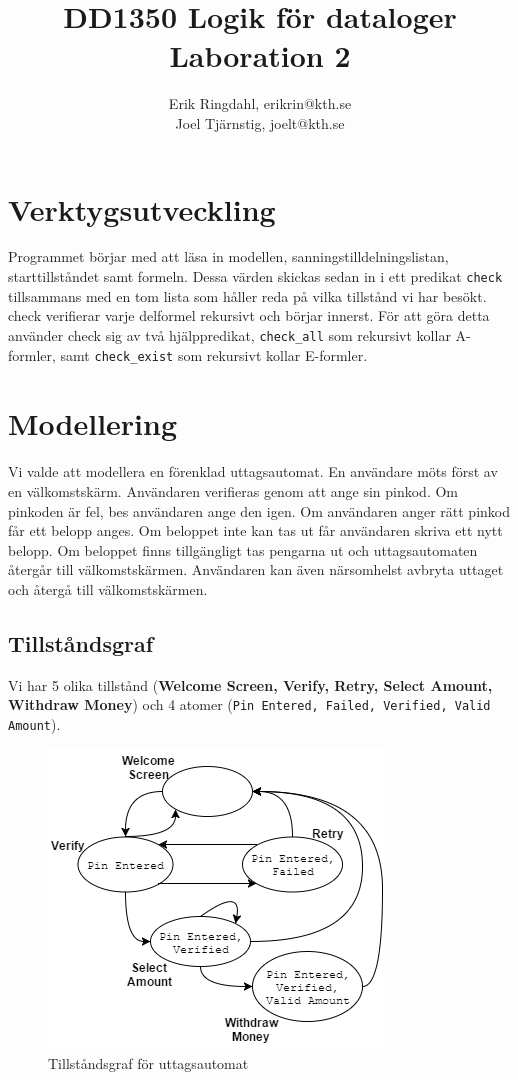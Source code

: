 \documentclass[]{article}
\title{DD1350 Logik för dataloger \\ Laboration 2}
\author{Erik Ringdahl, erikrin@kth.se \\ Joel Tjärnstig, joelt@kth.se}
\begin{document}
\setlength\parindent{0pt}
\maketitle

\section{Verktygsutveckling}
Programmet börjar med att läsa in modellen, sanningstilldelningslistan, starttillståndet samt formeln. Dessa värden skickas sedan in i ett predikat \texttt{check} tillsammans med en tom lista som håller reda på vilka tillstånd vi har besökt. check verifierar varje delformel rekursivt och börjar innerst. För att göra detta använder check sig av två hjälppredikat, \texttt{check\_all} som rekursivt kollar A-formler, samt \texttt{check\_exist} som rekursivt kollar E-formler.

\clearpage
\section{Modellering}
Vi valde att modellera en förenklad uttagsautomat. En användare möts först av en välkomstskärm. Användaren verifieras genom att ange sin pinkod. Om pinkoden är fel, bes användaren ange den igen. Om användaren anger rätt pinkod får ett belopp anges. Om beloppet inte kan tas ut får användaren skriva ett nytt belopp. Om beloppet finns tillgängligt tas pengarna ut och uttagsautomaten återgår till välkomstskärmen. Användaren kan även närsomhelst avbryta uttaget och återgå till välkomstskärmen.

\subsection{Tillståndsgraf}
Vi har 5 olika tillstånd (\textbf{Welcome Screen, Verify, Retry, Select Amount, Withdraw Money}) och 4 atomer (\texttt{Pin Entered, Failed, Verified, Valid Amount}).

\begin{figure}[h]
\centering
\includegraphics[width=0.75\linewidth]{modell}
\caption{Tillståndsgraf för uttagsautomat}
\label{fig:modell}
\end{figure}
\end{document}
